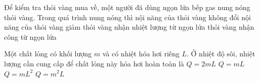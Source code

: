	\begin{ex}%
		Để kiểm tra thỏi vàng mua về, một người đã dùng ngọn lửa bếp gas nung nóng thỏi vàng. Trong quá trình nung nóng thì
		\choice
		{nội năng của thỏi vàng không đổi}
		{nội năng của thỏi vàng giảm}
		{\True thỏi vàng nhận nhiệt lượng từ ngọn lửa}
		{thỏi vàng nhận công từ ngọn lửa}
	\end{ex}

	\begin{ex}%
		Một chất lỏng có khối lượng $m$ và có nhiệt hóa hơi riêng $L$. Ở nhiệt độ sôi, nhiệt lượng cần cung cấp để chất lỏng này hóa hơi hoàn toàn là
		\choice
		{$Q=2mL$}
		{\True $Q=mL$}
		{$Q=mL^2$}
		{$Q=m^2L$}
	\end{ex}

